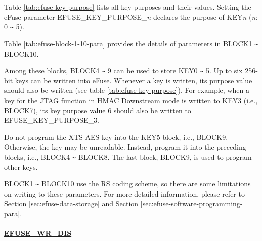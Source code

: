 \documentclass[main\_\_EN.tex]{subfiles}
\begin{document}
\clearpage
\begin{landscape}



\end{landscape}
\restoregeometry
\clearpage


Table \ref{tab:efuse-key-purpose} lists all key purposes and their values. Setting the eFuse parameter EFUSE\_KEY\_PURPOSE\_\textcolor{myred}{\it{n}} declares the purpose of KEY\textcolor{myred}{\it{n}} (\textcolor{myred}{\it{n}}: 0 \verb+~+ 5).



Table  \ref{tab:efuse-block-1-10-para} provides the details of parameters in BLOCK1 \verb+~+ BLOCK10. 

\clearpage
\begin{landscape}


\end{landscape}
\restoregeometry
\clearpage



Among these blocks, BLOCK4 \verb+~+ 9 can be used to store KEY0 \verb+~+ 5. Up to six 256-bit keys can be written into eFuse. Whenever a key is written, its purpose value should also be written (see table \ref{tab:efuse-key-purpose}). For example, when a key for the JTAG function in HMAC Downstream mode is written to KEY\textcolor{myred}{3} (i.e., BLOCK7), its key purpose value 6 should also be written to EFUSE\_KEY\_PURPOSE\_\textcolor{myred}{3}.

\begin{tiplisting}
Do not program the XTS-AES key into the KEY5 block, i.e., BLOCK9. Otherwise, the key may be unreadable. Instead, program it into the preceding blocks, i.e., BLOCK4 \verb+~+ BLOCK8. The last block, BLOCK9, is used to program other keys.
\end{tiplisting}

BLOCK1 \verb+~+ BLOCK10 use the RS coding scheme, so there are some limitations on writing to these parameters. For more detailed information, please refer to Section \ref{sec:efuse-data-storage} and Section \ref{sec:efuse-software-programming-para}.

\paragraph{\hyperref[fielddesc:EFUSEWRDIS]{EFUSE\_WR\_DIS}}
\label{sec:efuse-wr-dis}
\end{document}
